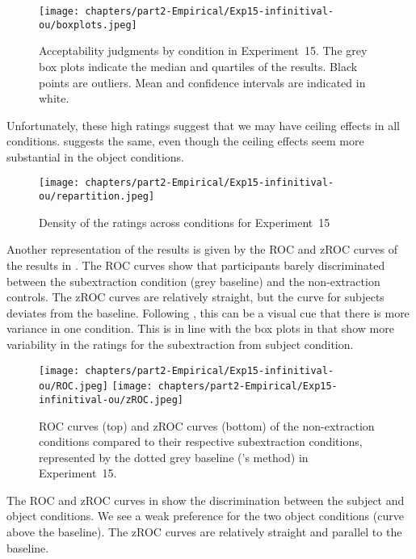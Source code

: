 \begin{figure}
    \centering
    \texttt{[image: chapters/part2-Empirical/Exp15-infinitival-ou/boxplots.jpeg]}
    \caption{Acceptability judgments by condition in Experiment~15. The grey box plots indicate the median and quartiles of the results. Black points are outliers. Mean and confidence intervals are indicated in white.}
    \label{fig:exp15-boxplot}
\end{figure}

Unfortunately, these high ratings suggest that we may have ceiling effects in all conditions.  suggests the same, even though the ceiling effects seem more substantial in the object conditions.

\begin{figure}
    \centering
    \texttt{[image: chapters/part2-Empirical/Exp15-infinitival-ou/repartition.jpeg]}
    \caption{Density of the ratings across conditions for Experiment~15}
    \label{fig:exp15-repartition}
\end{figure}

Another representation of the results is given by the ROC and zROC curves of the results in . The ROC curves show that participants barely discriminated between the subextraction condition (grey baseline) and the non-extraction controls. The zROC curves are relatively straight, but the curve for subjects deviates from the baseline. Following \citet{Dillon.2019}, this can be a visual cue that there is more variance in one condition. This is in line with the box plots in  that show more variability in the ratings for the subextraction from subject condition.\pagebreak

\begin{figure}[ph]
    \centering
    \texttt{[image: chapters/part2-Empirical/Exp15-infinitival-ou/ROC.jpeg]}
    \texttt{[image: chapters/part2-Empirical/Exp15-infinitival-ou/zROC.jpeg]}
    \caption{ROC curves (top) and zROC curves (bottom) of the non-extraction conditions compared to their respective subextraction conditions, represented by the dotted grey baseline (\citealt{Dillon.2019}'s method) in Experiment~15.}
    \label{fig:exp15-ROC}
\end{figure}
\pagebreak

The ROC and zROC curves in  show the discrimination between the subject and object conditions. We see a weak preference for the two object conditions (curve above the baseline). The zROC curves are relatively straight and parallel to the baseline.

